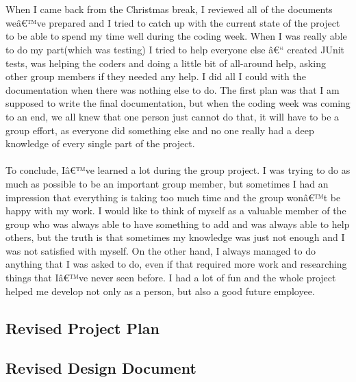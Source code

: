 \documentclass[12pt]{article}
\begin{document}
~\\\\
When I came back from the Christmas break, I reviewed all of the documents weâ€™ve prepared and I tried to catch up with the current state of the project to be able to spend my time well during the coding week. When I was really able to do my part(which was testing) I tried to help everyone else â€“ created JUnit tests, was helping the coders and doing a little bit of all-around help, asking other group members if they needed any help. I did all I could with the documentation when there was nothing else to do. The first plan was that I am supposed to write the final documentation, but when the coding week was coming to an end, we all knew that one person just cannot do that, it will have to be a group effort, as everyone did something else and no one really had a deep knowledge of every single part of the project.
~\\\\
To conclude, Iâ€™ve learned a lot during the group project. I was trying to do as much as possible to be an important group member, but sometimes I had an impression that everything is taking too much time and the group wonâ€™t be happy with my work. I would like to think of myself as a valuable member of the group who was always able to have something to add and was always able to help others, but the truth is that sometimes my knowledge was just not enough and I was not satisfied with myself. On the other hand, I always managed to do anything that I was asked to do, even if that required more work and researching things that Iâ€™ve never seen before. I had a lot of fun and the whole project helped me develop not only as a person, but also a good future employee.
\newpage

\subsection{Revised Project Plan}


\restoregeometry


\subsection{Revised Design Document}


\restoregeometry

\end{document}

